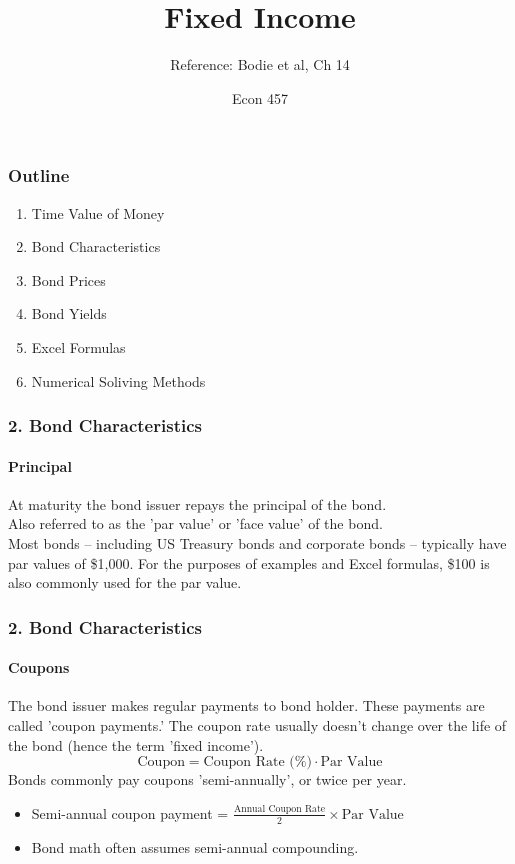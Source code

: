 \documentclass{beamer}
\title{Fixed Income}
\subtitle{Reference: Bodie et al, Ch 14}
\author{Econ 457}
\date{\week}
\begin{document}
\frame{\titlepage}

\begin{frame}
    \frametitle{Outline}

    \begin{enumerate}
        \item Time Value of Money
        \item Bond Characteristics
        \item Bond Prices
        \item Bond Yields
        \item Excel Formulas
        \item Numerical Soliving Methods
    \end{enumerate}
\end{frame}



\begin{frame}[t]
    \frametitle{2. Bond Characteristics}
    \framesubtitle{Principal}

    At maturity the bond issuer repays the principal of the bond.\\
    \vspace{1em}
    Also referred to as the 'par value' or 'face value' of the bond.\\
    \vspace{1em}
    Most bonds -- including US Treasury bonds and corporate bonds -- 
    typically have par values of \$1,000.  
    For the purposes of examples and Excel formulas, \$100 is also commonly used for the par value.
    
\end{frame}


\begin{frame}[t]
    \frametitle{2. Bond Characteristics}
    \framesubtitle{Coupons}

    The bond issuer makes regular payments to bond holder.  
    These payments are called 'coupon payments.'   The coupon rate usually doesn't change over the life of the bond (hence the term 'fixed income').\\
    $$\text{Coupon} = \text{Coupon Rate (\%)} \cdot \text{Par Value}$$
    Bonds commonly pay coupons 'semi-annually', or twice per year.\\
    \vspace{1em}
    \begin{itemize}
        \item Semi-annual coupon payment = $\frac{\text{Annual Coupon Rate}}{2} \times \text{Par Value}$
        \item Bond math often assumes semi-annual compounding.   
    \end{itemize}

\end{frame}
\end{document}
